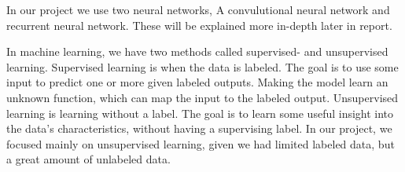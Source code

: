 \noindent
In our project we use two neural networks, A convulutional neural network and recurrent neural network. These will be explained more in-depth later in report.

\noindent
In machine learning, we have two methods called supervised- and unsupervised learning. Supervised learning is when the data is labeled. The goal is to use some input to predict one or more given labeled outputs. Making the model learn an unknown function, which can map the input to the labeled output. Unsupervised learning is learning without a label. The goal is to learn some useful insight into the data's characteristics, without having a supervising label. In our project, we focused mainly on unsupervised learning, given we had limited labeled data, but a great amount of unlabeled data. \\
